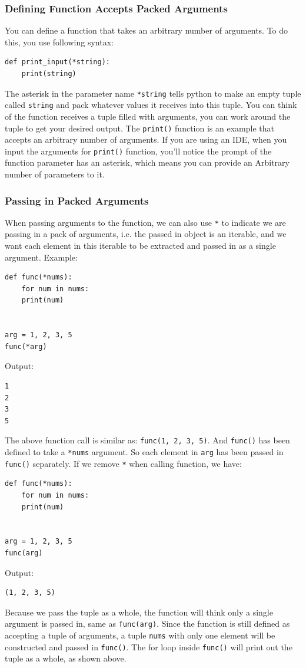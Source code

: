 \documentclass[12pt]{book}
\begin{document}
\subsubsection{Defining Function Accepts Packed Arguments}
\label{sec:orge06d1fc}
You can define a function that takes an arbitrary number of arguments. To do this, you use following syntax:
\begin{verbatim}
def print_input(*string):
    print(string)
\end{verbatim}
The asterisk in the parameter name \texttt{*string} tells python to make an empty tuple called \texttt{string} and pack whatever values it receives into this tuple. You can think of the function receives a tuple filled with arguments, you can work around the tuple to get your desired output. The \texttt{print()} function is an example that accepts an arbitrary number of arguments. If you are using an IDE, when you input the arguments for \texttt{print()} function, you'll notice the prompt of the function parameter has an asterisk, which means you can provide an Arbitrary number of parameters to it.

\subsubsection{Passing in Packed Arguments}
\label{sec:org17a32cd}
When passing arguments to the function, we can also use \texttt{*} to indicate we are passing in a pack of arguments, i.e. the passed in object is an iterable, and we want each element in this iterable to be extracted and passed in as a single argument. Example:
\begin{verbatim}
def func(*nums):
    for num in nums:
	print(num)


arg = 1, 2, 3, 5
func(*arg)
\end{verbatim}
Output:
\begin{verbatim}
1
2
3
5
\end{verbatim}
The above function call is similar as: \texttt{func(1, 2, 3, 5)}. And \texttt{func()} has been defined to take a \texttt{*nums} argument. So each element in \texttt{arg} has been passed in \texttt{func()} separately. If we remove \texttt{*} when calling function, we have:
\begin{verbatim}
def func(*nums):
    for num in nums:
	print(num)


arg = 1, 2, 3, 5
func(arg)
\end{verbatim}
Output:
\begin{verbatim}
(1, 2, 3, 5)
\end{verbatim}
Because we pass the tuple as a whole, the function will think only a single argument is passed in, same as \texttt{func(arg)}. Since the function is still defined as accepting a tuple of arguments, a tuple \texttt{nums}  with only one element will be constructed and passed in \texttt{func()}. The for loop inside \texttt{func()} will print out the tuple as a whole, as shown above.
\end{document}
